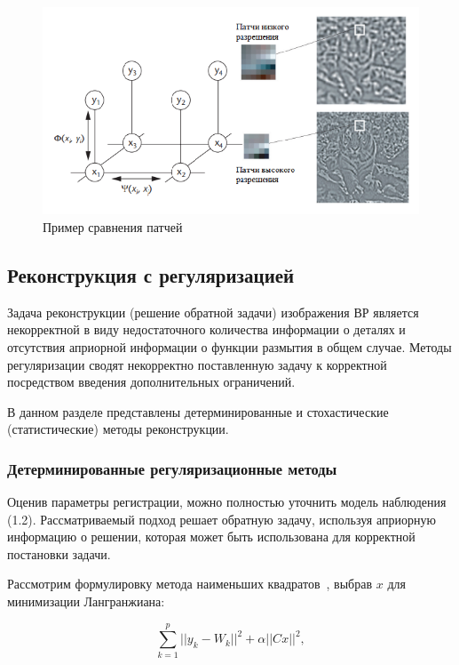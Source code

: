 \begin{figure}[H]
	\centering
	\includegraphics[scale=1.0]{assets/patch_1.png}
	\caption{Пример сравнения патчей}
	\label{fig:patch_2}
\end{figure}

\subsection{Реконструкция с регуляризацией}

Задача реконструкции (решение обратной задачи) изображения ВР является некорректной в виду недостаточного количества информации о деталях и отсутствия априорной информации о функции размытия в общем случае. Методы регуляризации сводят некорректно поставленную задачу к корректной посредством введения дополнительных ограничений. 

В данном разделе представлены детерминированные и стохастические (статистические) методы реконструкции.

\clearpage

\subsubsection{Детерминированные регуляризационные методы}

Оценив параметры регистрации, можно полностью уточнить модель наблюдения (1.2). Рассматриваемый подход решает обратную задачу, используя априорную информацию о решении, которая может быть использована для корректной постановки задачи.

Рассмотрим формулировку метода наименьших квадратов~\cite{mnk}, выбрав $x$ для минимизации Лангранжиана:

\begin{equation}
    \sum_{k=1}^{p} ||y_k - W_k||^2 + \alpha ||Cx||^2,
\end{equation}

